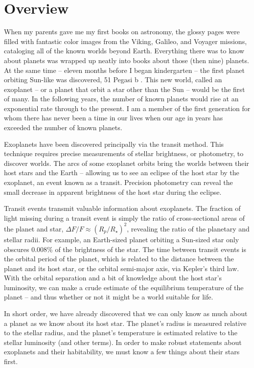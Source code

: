 
\section{Overview}
When my parents gave me my first books on astronomy, the glossy pages were filled with fantastic color images from the Viking, Galileo, and Voyager missions, cataloging all of the known worlds beyond Earth. Everything there was to know about planets was wrapped up neatly into books about those (then nine) planets. At the same time -- eleven months before I began kindergarten -- the first planet orbiting Sun-like was discovered, 51 Pegasi b \citep{Mayor1995}. This new world, called an exoplanet -- or a planet that orbit a star other than the Sun -- would be the first of many. In the following years, the number of known planets would rise at an exponential rate through to the present. I am a member of the first generation for whom there has never been a time in our lives when our age in years has exceeded the number of known planets.

Exoplanets have been discovered principally via the transit method. This technique requires precise measurements of stellar brightness, or photometry, to discover worlds. The arcs of some exoplanet orbits bring the worlds between their host stars and the Earth -- allowing us to see an eclipse of the host star by the exoplanet, an event known as a transit. Precision photometry can reveal the small decrease in apparent brightness of the host star during the eclipse. 

Transit events transmit valuable information about exoplanets. The fraction of light missing during a transit event is simply the ratio of cross-sectional areas of the planet and star, $\Delta F/F \approx (R_p/R_\star)^2$, revealing the ratio of the planetary and stellar radii. For example, an Earth-sized planet orbiting a Sun-sized star only obscures 0.008\% of the brightness of the star. The time between transit events is the orbital period of the planet, which is related to the distance between the planet and its host star, or the orbital semi-major axis, via Kepler's third law. With the orbital separation and a bit of knowledge about the host star's luminosity, we can make a crude estimate of the equilibrium temperature of the planet -- and thus whether or not it might be a world suitable for life.

In short order, we have already discovered that we can only know as much about a planet as we know about its host star. The planet's radius is measured relative to the stellar radius, and the planet's temperature is estimated relative to the stellar luminosity (and other terms). In order to make robust statements about exoplanets and their habitability, we must know a few things about their stars first.  

